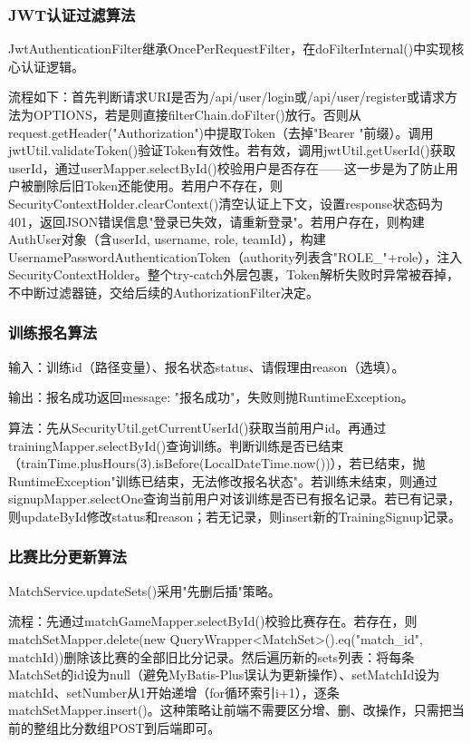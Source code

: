 \documentclass[12pt,a4paper]{ctexart}
\begin{document}
\subsubsection{JWT认证过滤算法}

JwtAuthenticationFilter继承OncePerRequestFilter，在doFilterInternal()中实现核心认证逻辑。

流程如下：首先判断请求URI是否为/api/user/login或/api/user/register或请求方法为OPTIONS，若是则直接filterChain.doFilter()放行。否则从request.getHeader("Authorization")中提取Token（去掉"Bearer "前缀）。调用jwtUtil.validateToken()验证Token有效性。若有效，调用jwtUtil.getUserId()获取userId，通过userMapper.selectById()校验用户是否存在——这一步是为了防止用户被删除后旧Token还能使用。若用户不存在，则SecurityContextHolder.clearContext()清空认证上下文，设置response状态码为401，返回JSON错误信息"登录已失效，请重新登录"。若用户存在，则构建AuthUser对象（含userId, username, role, teamId），构建UsernamePasswordAuthenticationToken（authority列表含"ROLE\_"+role），注入SecurityContextHolder。整个try-catch外层包裹，Token解析失败时异常被吞掉，不中断过滤器链，交给后续的AuthorizationFilter决定。

\subsubsection{训练报名算法}

输入：训练id（路径变量）、报名状态status、请假理由reason（选填）。

输出：报名成功返回{message: "报名成功"}，失败则抛RuntimeException。

算法：先从SecurityUtil.getCurrentUserId()获取当前用户id。再通过trainingMapper.selectById()查询训练。判断训练是否已结束（trainTime.plusHours(3).isBefore(LocalDateTime.now())），若已结束，抛RuntimeException"训练已结束，无法修改报名状态"。若训练未结束，则通过signupMapper.selectOne查询当前用户对该训练是否已有报名记录。若已有记录，则updateById修改status和reason；若无记录，则insert新的TrainingSignup记录。

\subsubsection{比赛比分更新算法}

MatchService.updateSets()采用"先删后插"策略。

流程：先通过matchGameMapper.selectById()校验比赛存在。若存在，则matchSetMapper.delete(new QueryWrapper<MatchSet>().eq("match\_id", matchId))删除该比赛的全部旧比分记录。然后遍历新的sets列表：将每条MatchSet的id设为null（避免MyBatis-Plus误认为更新操作）、setMatchId设为matchId、setNumber从1开始递增（for循环索引i+1），逐条matchSetMapper.insert()。这种策略让前端不需要区分增、删、改操作，只需把当前的整组比分数组POST到后端即可。
\end{document}
